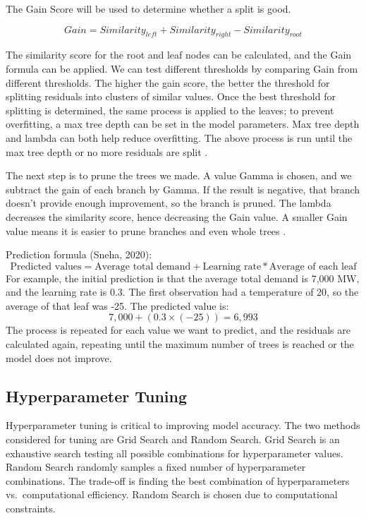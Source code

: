 \documentclass[mstat,12pt]{unswthesis}
\begin{document}
The Gain Score will be used to determine whether a split is good.

\[
Gain = {Similarity}_{left} + {Similarity}_{right} - {Similarity}_{root}
\]

The similarity score for the root and leaf nodes can be calculated, and
the Gain formula can be applied. We can test different thresholds by
comparing Gain from different thresholds. The higher the gain score, the
better the threshold for splitting residuals into clusters of similar
values. Once the best threshold for splitting is determined, the same
process is applied to the leaves; to prevent overfitting, a max tree
depth can be set in the model parameters. Max tree depth and lambda can
both help reduce overfitting. The above process is run until the max
tree depth or no more residuals are split \cite{a2016_how}.

The next step is to prune the trees we made. A value Gamma is chosen,
and we subtract the gain of each branch by Gamma. If the result is
negative, that branch doesn't provide enough improvement, so the branch
is pruned. The lambda decreases the similarity score, hence decreasing
the Gain value. A smaller Gain value means it is easier to prune
branches and even whole trees \cite{a2016_how}.

Prediction formula (Sneha, 2020): \[
\text{Predicted values} = \text{Average total demand} + \text{Learning rate} * \text{Average of each leaf}
\] For example, the initial prediction is that the average total demand
is 7,000 MW, and the learning rate is 0.3. The first observation had a
temperature of 20, so the average of that leaf was -25. The predicted
value is: \[
7,000 + (0.3 \times (-25)) = 6,993
\] The process is repeated for each value we want to predict, and the
residuals are calculated again, repeating until the maximum number of
trees is reached or the model does not improve.

\subsection{Hyperparameter Tuning}\label{hyperparameter-tuning}

Hyperparameter tuning is critical to improving model accuracy. The two
methods considered for tuning are Grid Search and Random Search. Grid
Search is an exhaustive search testing all possible combinations for
hyperparameter values. Random Search randomly samples a fixed number of
hyperparameter combinations. The trade-off is finding the best
combination of hyperparameters vs.~computational efficiency. Random
Search is chosen due to computational constraints.
\end{document}
